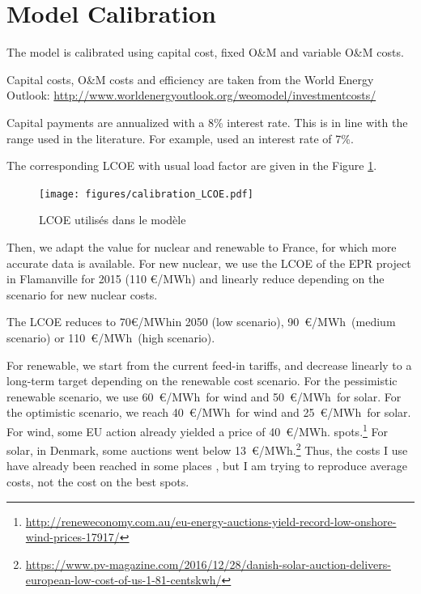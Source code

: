 \documentclass[authoryear]{elsarticle}
\newcommand\emwh{\euro/MWh}
\begin{document}

\clearpage

\section{Model Calibration}
\label{app:calibration}

The model is calibrated using capital cost, fixed O\&M and variable O\&M costs. 

Capital costs, O\&M costs and efficiency are taken from the World Energy Outlook: \url{http://www.worldenergyoutlook.org/weomodel/investmentcosts/}

Capital payments are annualized with a 8\% interest rate. This is in line with the range used in the literature. For example, \citet{Hirth2014} used an interest rate of 7\%.

The corresponding LCOE with usual load factor are given in the Figure \ref{fig:calibration_LCOE}.

\begin{figure}[!ht]
	\centering
	\texttt{[image: figures/calibration\_LCOE.pdf]}
	\caption{LCOE utilisés dans le modèle}
	\label{fig:calibration_LCOE}
\end{figure}

Then, we adapt the value for nuclear and renewable to France, for which more accurate data is available.
For new nuclear, we use the LCOE of the EPR project in Flamanville for 2015 (110 \emwh) and linearly reduce depending on the scenario for new nuclear costs. 

The LCOE reduces to 70\emwh in 2050 (low scenario), 90~\emwh~(medium scenario) or 110~\emwh~(high scenario).

For renewable, we start from the current feed-in tariffs, and decrease linearly to a long-term target depending on the renewable cost scenario. For the pessimistic renewable scenario, we use 60~\emwh~for wind and 50~\emwh~for solar. For the optimistic scenario, we reach 40~\emwh~for wind and 25~\emwh~for solar.
For wind, some EU action already yielded a price of 40~\emwh. spots.\footnote{\url{http://reneweconomy.com.au/eu-energy-auctions-yield-record-low-onshore-wind-prices-17917/}}
For solar, in Denmark, some auctions went below 13~\emwh.\footnote{\url{https://www.pv-magazine.com/2016/12/28/danish-solar-auction-delivers-european-low-cost-of-us-1-81-centskwh/}}
Thus, the costs I use have already been reached in some places , but I am trying to reproduce average costs, not the cost on the best spots. 
\end{document}
